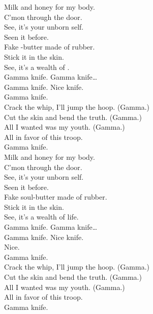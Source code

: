 


Milk and honey for my body. \\
C'mon through the door. \\
See, it's your unborn self. \\
Seen it before. \\

Fake -butter made of rubber. \\
Stick it in the skin. \\
See, it's a wealth of . \\

Gamma knife. Gamma knife… \\

Gamma knife. Nice knife. \\
Gamma knife. \\

Crack the whip, I'll jump the hoop. (Gamma.) \\
Cut the skin and bend the truth. (Gamma.) \\
All I wanted was my youth. (Gamma.) \\
All in favor of this troop. \\
Gamma knife. \\

Milk and honey for my body. \\
C'mon through the door. \\
See, it's your unborn self. \\

Seen it before. \\
Fake soul-butter made of rubber. \\
Stick it in the skin. \\
See, it's a wealth of life. \\

Gamma knife. Gamma knife… \\

Gamma knife. Nice knife. \\
Nice. \\
Gamma knife. \\

Crack the whip, I'll jump the hoop. (Gamma.) \\
Cut the skin and bend the truth. (Gamma.) \\
All I wanted was my youth. (Gamma.) \\
All in favor of this troop. \\
Gamma knife. \\

